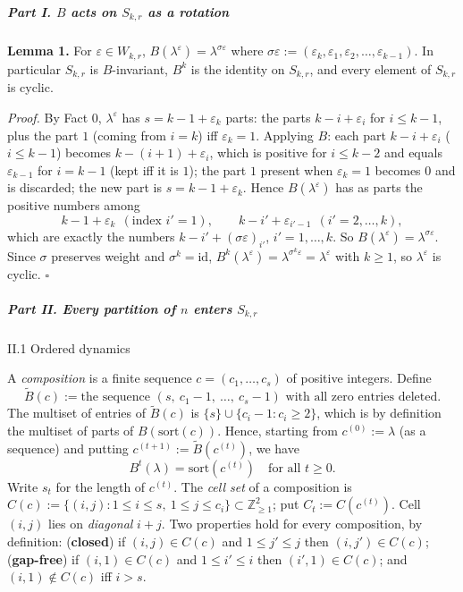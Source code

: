 \documentclass[11pt,a4paper]{article}
\begin{document}
\subparagraph{\texorpdfstring{Part I. \(B\) acts on \(S_{k,r}\) as a
rotation}{Part I. B acts on S\_\{k,r\} as a rotation}}\label{part-i.-b-acts-on-s_kr-as-a-rotation}

\textbf{Lemma 1.} For \(\varepsilon\in W_{k,r}\),
\(B(\lambda^\varepsilon)=\lambda^{\sigma\varepsilon}\) where
\(\sigma\varepsilon:=(\varepsilon_k,\varepsilon_1,\varepsilon_2,\dots,\varepsilon_{k-1})\).
In particular \(S_{k,r}\) is \(B\)-invariant, \(B^k\) is the identity on
\(S_{k,r}\), and every element of \(S_{k,r}\) is cyclic.

\emph{Proof.} By Fact 0, \(\lambda^\varepsilon\) has
\(s=k-1+\varepsilon_k\) parts: the parts \(k-i+\varepsilon_i\) for
\(i\le k-1\), plus the part \(1\) (coming from \(i=k\)) iff
\(\varepsilon_k=1\). Applying \(B\): each part \(k-i+\varepsilon_i\)
(\(i\le k-1\)) becomes \(k-(i+1)+\varepsilon_i\), which is positive for
\(i\le k-2\) and equals \(\varepsilon_{k-1}\) for \(i=k-1\) (kept iff it
is \(1\)); the part \(1\) present when \(\varepsilon_k=1\) becomes \(0\)
and is discarded; the new part is \(s=k-1+\varepsilon_k\). Hence
\(B(\lambda^\varepsilon)\) has as parts the positive numbers among
\[k-1+\varepsilon_k\ \ (\text{index }i'=1),\qquad k-i'+\varepsilon_{i'-1}\ \ (i'=2,\dots,k),\]
which are exactly the numbers \(k-i'+(\sigma\varepsilon)_{i'}\),
\(i'=1,\dots,k\). So
\(B(\lambda^\varepsilon)=\lambda^{\sigma\varepsilon}\). Since \(\sigma\)
preserves weight and \(\sigma^k=\mathrm{id}\),
\(B^k(\lambda^\varepsilon)=\lambda^{\sigma^k\varepsilon}=\lambda^\varepsilon\)
with \(k\ge1\), so \(\lambda^\varepsilon\) is cyclic. \(\square\)

\subparagraph{\texorpdfstring{Part II. Every partition of \(n\) enters
\(S_{k,r}\)}{Part II. Every partition of n enters S\_\{k,r\}}}\label{part-ii.-every-partition-of-n-enters-s_kr}

II.1 Ordered dynamics

A \emph{composition} is a finite sequence \(c=(c_1,\dots,c_s)\) of
positive integers. Define
\[\tilde B(c):=\text{the sequence }(s,\ c_1-1,\ \dots,\ c_s-1)\text{ with all zero entries deleted}.\]
The multiset of entries of \(\tilde B(c)\) is
\(\{s\}\cup\{c_i-1:c_i\ge2\}\), which is by definition the multiset of
parts of \(B(\mathrm{sort}(c))\). Hence, starting from
\(c^{(0)}:=\lambda\) (as a sequence) and putting
\(c^{(t+1)}:=\tilde B(c^{(t)})\), we have
\[B^t(\lambda)=\mathrm{sort}(c^{(t)})\quad\text{for all }t\ge0. \tag{1}\]
Write \(s_t\) for the length of \(c^{(t)}\). The \emph{cell set} of a
composition is
\(C(c):=\{(i,j):1\le i\le s,\ 1\le j\le c_i\}\subset\mathbb Z_{\ge1}^2\);
put \(C_t:=C(c^{(t)})\). Cell \((i,j)\) lies on \emph{diagonal} \(i+j\).
Two properties hold for every composition, by definition:
(\textbf{closed}) if \((i,j)\in C(c)\) and \(1\le j'\le j\) then
\((i,j')\in C(c)\); (\textbf{gap-free}) if \((i,1)\in C(c)\) and
\(1\le i'\le i\) then \((i',1)\in C(c)\); and \((i,1)\notin C(c)\) iff
\(i>s\).
\end{document}
